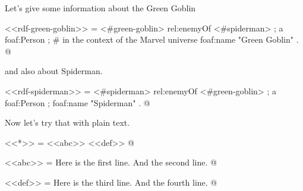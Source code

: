 \documentclass{article}
\begin{document}
Let's give some information about the Green Goblin

<<rdf-green-goblin>> =
<#green-goblin>
    rel:enemyOf <#spiderman> ;
    a foaf:Person ;    # in the context of the Marvel universe
    foaf:name "Green Goblin" .
@

and also about Spiderman.

<<rdf-spiderman>> =
<#spiderman>
    rel:enemyOf <#green-goblin> ;
    a foaf:Person ;
    foaf:name "Spiderman" .
@

Now let's try that with plain text.

<<*>> =
  <<abc>>
  <<def>>
@

<<abc>> =
  Here is the first line.
  And the second line.
@

<<def>> =
  Here is the third line.
  And the fourth line.
@
\end{document}
